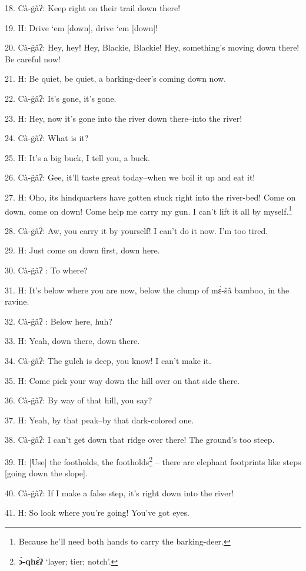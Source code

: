 18. Cà-g̈âʔ: Keep right on their trail down there!

19. H: Drive `em [down], drive `em [down]!

20. Cà-g̈âʔ: Hey, hey! Hey, Blackie, Blackie! Hey, something's moving down
there! Be careful now!

21. H: Be quiet, be quiet, a barking-deer's coming down now.

22. Cà-g̈âʔ: It's gone, it's gone.


23. H: Hey, now it's gone into the river down there--into the river!

24. Cà-g̈âʔ: What is it?

25. H: It's a big buck, I tell you, a buck.

26. Cà-g̈âʔ: Gee, it'll taste great today--when we boil it up and eat it!

27. H: Oho, its hindquarters have gotten stuck right into the river-bed! Come on
down, come on down! Come help me carry my gun. I can't lift it all by myself.\footnote{Because he'll need both hands to carry the barking-deer.}

28. Cà-g̈âʔ: Aw, you carry it by yourself! I can't do it now. I'm too tired.

29. H: Just come on down first, down here.

30. Cà-g̈âʔ : To where?

31. H: It's below where you are now, below the clump of mɛ̀-šâ bamboo, in the
ravine.

32. Cà-g̈âʔ : Below here, huh?

33. H: Yeah, down there, down there.

34. Cà-g̈âʔ: The gulch is deep, you know! I can't make it.

35. H: Come pick your way down the hill over on that side there.

36. Cà-g̈âʔ: By way of that hill, you say?

37. H: Yeah, by that peak--by that dark-colored one.

38. Cà-g̈âʔ: I can't get down that ridge over there! The ground's too steep.

39. H: [Use] the footholds, the footholds\footnote{\textbf{ɔ̀-qhɛ̀ʔ} `layer; tier; notch'.} -- there are elephant footprints like
steps [going down the slope].

40. Cà-g̈âʔ: If I make a false step, it's right down into the river!

41. H: So look where you're going! You've got eyes.

